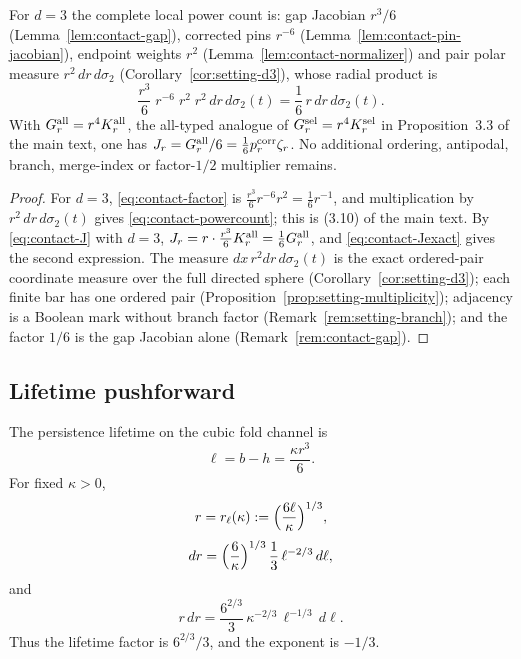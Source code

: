 \begin{corollary}\label{cor:contact-powercount}
For $d=3$ the complete local power count is: gap Jacobian $r^3/6$ (Lemma~\ref{lem:contact-gap}), corrected pins $r^{-6}$ (Lemma~\ref{lem:contact-pin-jacobian}), endpoint weights $r^2$ (Lemma~\ref{lem:contact-normalizer}) and pair polar measure $r^2\,dr\,d\sigma_2$ (Corollary~\ref{cor:setting-d3}), whose radial product is
\begin{equation}\label{eq:contact-powercount}
\frac{r^3}6\;r^{-6}\;r^2\;r^2\,dr\,d\sigma_2(t)=\frac16\,r\,dr\,d\sigma_2(t).
\end{equation}
With $G^{\rm all}_r=r^4K^{\rm all}_r$, the all-typed analogue of $G^{\rm sel}_r=r^4K^{\rm sel}_r$ in Proposition~3.3 of the main text, one has $J_r=G^{\rm all}_r/6=\frac16p^{\rm corr}_r\zeta_r$. No additional ordering, antipodal, branch, merge-index or factor-$1/2$ multiplier remains.
\end{corollary}

\begin{proof}
For $d=3$, \eqref{eq:contact-factor} is $\frac{r^3}6r^{-6}r^2=\frac16r^{-1}$, and multiplication by $r^2\,dr\,d\sigma_2(t)$ gives \eqref{eq:contact-powercount}; this is (3.10) of the main text. By \eqref{eq:contact-J} with $d=3$, $J_r=r\cdot\frac{r^3}6K^{\rm all}_r=\frac16G^{\rm all}_r$, and \eqref{eq:contact-Jexact} gives the second expression. The measure $dx\,r^2dr\,d\sigma_2(t)$ is the exact ordered-pair coordinate measure over the full directed sphere (Corollary~\ref{cor:setting-d3}); each finite bar has one ordered pair (Proposition~\ref{prop:setting-multiplicity}); adjacency is a Boolean mark without branch factor (Remark~\ref{rem:setting-branch}); and the factor $1/6$ is the gap Jacobian alone (Remark~\ref{rem:contact-gap}).
\end{proof}

\subsection{Lifetime pushforward}\label{ssec:contact-pushforward}

\begin{lemma}\label{lem:contact-lifetime}
The persistence lifetime on the cubic fold channel is
\begin{equation}\label{eq:contact-ell}
\ell=b-h=\frac{\kappa r^3}6 .
\end{equation}
For fixed $\kappa>0$,
\begin{equation}\label{eq:contact-rell}
r=r_\ell(\kappa):=\Bigl(\frac{6\ell}\kappa\Bigr)^{1/3},
\end{equation}
\begin{equation}\label{eq:contact-dr}
dr=\Bigl(\frac6\kappa\Bigr)^{1/3}\,\frac13\,\ell^{-2/3}\,d\ell,
\end{equation}
and
\begin{equation}\label{eq:contact-rdr}
r\,dr=\frac{6^{2/3}}3\,\kappa^{-2/3}\,\ell^{-1/3}\,d\ell .
\end{equation}
Thus the lifetime factor is $6^{2/3}/3$, and the exponent is $-1/3$.
\end{lemma}

